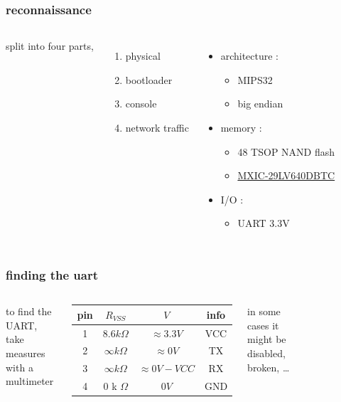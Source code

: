 \documentclass{beamer}
\begin{document}
\begin{frame}
	\frametitle{reconnaissance}
	\begin{columns}
		split into four parts, 
		\begin{enumerate}
			\item physical
			\item bootloader
			\item console
			\item network traffic
		\end{enumerate}
		\begin{itemize}
			\item architecture : 
				\begin{itemize}
					\item MIPS32
					\item big endian
				\end{itemize}
			\item memory :
				\begin{itemize}
					\item 48 TSOP NAND flash
					\item \href{https://www.alldatasheet.com/datasheet-pdf/view/267962/MCNIX/MX29LV640DBTC-90G.html}{MXIC-29LV640DBTC}
				\end{itemize}
			\item I/O :
				\begin{itemize}
					\item UART 3.3V
				\end{itemize}
		\end{itemize}
	\end{columns}
\end{frame}

\begin{frame}
	\frametitle{finding the uart}
	\begin{columns}
		\column{0.7\textwidth}	
		to find the UART, take measures with a multimeter
		\begin{center}
		\begin{tabular}{|c|c|c|c|}
			\hline
			pin & $R_{VSS}$ & $V$ & info \\ 
			\hline
			1 & $8.6k\Omega$ & $\approx 3.3V$ & VCC \\
			2 & $\infty k\Omega$ & $\approx 0V$ & TX\\
			3 & $\infty k\Omega$ & $\approx 0V - VCC$ & RX \\
			4 & $0$ k $\Omega$ & $0V$ & GND \\
			\hline
		\end{tabular}
		\end{center}
		in some cases it might be disabled, broken, \dots
		\column{0.3\textwidth}	
		\begin{figure}
			\centering	
			\scalebox{0.5}{
			
		}
		\end{figure}
	\end{columns}
\end{frame}
\end{document}
